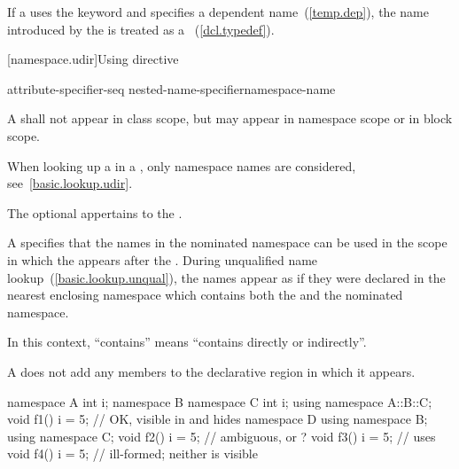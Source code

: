 \pnum
If a  uses the keyword  and
specifies a dependent name~(\ref{temp.dep}), the name introduced by the
 is treated as a
~(\ref{dcl.typedef}).%

[namespace.udir]{Using directive}%

\begin{bnf}
\br
    attribute-specifier-seq\opt{}  nested-name-specifier\opt namespace-name \terminal{;}
\end{bnf}

\pnum
A  shall not appear in class scope, but may
appear in namespace scope or in block scope.
\begin{note}
When looking up a  in a
, only namespace names are considered,
see~\ref{basic.lookup.udir}.
\end{note}
The optional  appertains to the .

\pnum
A  specifies that the names in the nominated
namespace can be used in the scope in which the
 appears after the .
During unqualified name lookup~(\ref{basic.lookup.unqual}), the names
appear as if they were declared in the nearest enclosing namespace which
contains both the  and the nominated
namespace.
\begin{note}
In this context, ``contains'' means ``contains directly or indirectly''.
\end{note}

\pnum
A  does not add any members to the declarative
region in which it appears.
\begin{example}

\begin{codeblock}
namespace A {
  int i;
  namespace B {
    namespace C {
      int i;
    }
    using namespace A::B::C;
    void f1() {
      i = 5;        // OK,  visible in  and hides 
    }
  }
  namespace D {
    using namespace B;
    using namespace C;
    void f2() {
      i = 5;        // ambiguous,  or ?
    }
  }
  void f3() {
    i = 5;          // uses 
  }
}
void f4() {
  i = 5;            // ill-formed; neither  is visible
}
\end{codeblock}
\end{example}

